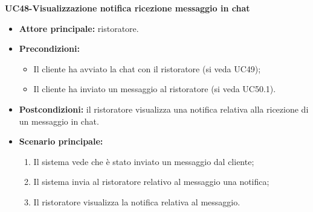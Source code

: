 \textbf{UC48-Visualizzazione notifica ricezione messaggio in chat}
\begin{itemize}
\item \textbf{Attore principale:} ristoratore.
\item \textbf{Precondizioni:}
\begin{itemize}
    \item Il cliente ha avviato la chat con il ristoratore (si veda UC49);
    \item Il cliente ha inviato un messaggio al ristoratore (si veda UC50.1).
\end{itemize}
\item \textbf{Postcondizioni:} il ristoratore visualizza una notifica relativa alla ricezione di un messaggio in chat.
\item \textbf{Scenario principale:}
\begin{enumerate}
    \item Il sistema vede che è stato inviato un messaggio dal cliente;
    \item Il sistema invia al ristoratore relativo al messaggio una notifica;
    \item Il ristoratore visualizza la notifica relativa al messaggio.
\end{enumerate}
\end{itemize}


